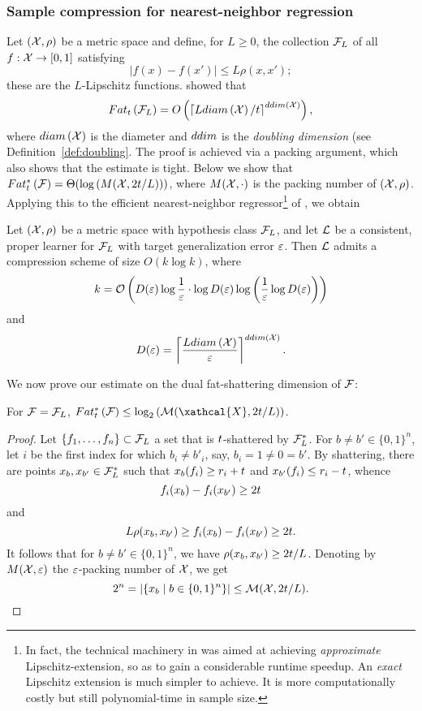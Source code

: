\documentclass[12pt,a4paper,oneside,onecolumn]{book}
\begin{document}
\subsubsection{Sample compression for nearest-neighbor regression}
\label{sec:NN}
Let $(\mathcal{X},\rho)$ be a metric space
and define, for $L\ge0$, the collection $\mathcal{F}_L$ of all $f:\mathcal{X}\to[0,1]$ satisfying
$$ |f(x)-f(x')|\le L\rho(x,x');$$
these are the $L$-Lipschitz functions.
\citet{GottliebKK17_IEEE} showed that
\begin{eqnarray*}
Fat_{t}\left(\mathcal{F}_L\right) = O\left(  \left\lceil Ldiam\left(\mathcal{X}\right)/t\right\rceil^{ddim(\mathcal{X})} \right),
\end{eqnarray*}
where $diam\left(\mathcal{X}\right)$ is the diameter and $ddim$ is the {\em doubling dimension} (see Definition~\ref{def:doubling}.
The proof is achieved via a packing argument, which also shows that the estimate is tight.
Below we show that
$  Fat^*_{t}\left(\mathcal{F}\right) =
\Theta(\log\left({M}(\mathcal{X},2t/L)\right))$,
where $M(\mathcal{X},\cdot)$ is the packing number of $(\mathcal{X},\rho)$.
Applying this to the efficient
nearest-neighbor regressor\footnote{
  In fact, the technical machinery in
  \citet{DBLP:journals/tit/GottliebKK17}
  was aimed at achieving {\em approximate} Lipschitz-extension,
  so as to gain a considerable runtime speedup. An {\em exact} Lipschitz extension
  is much simpler to achieve. It is more computationally costly but still polynomial-time in sample size.
  }
of
\citet{DBLP:journals/tit/GottliebKK17},
we obtain
\begin{corollary}
  Let $(\mathcal{X},\rho)$ be a metric space with hypothesis class $\mathcal{F}_L$,
  and let $\mathcal{L}$ be a consistent, proper learner for $\mathcal{F}_L$ with target generalization error $\varepsilon$.
Then $\mathcal{L}$ admits a compression scheme of size $O(k\log k)$, where
  \[k = \mathcal{O}\left( D(\varepsilon) \log \frac{1}{\varepsilon} \cdot \log D(\varepsilon)
      \log \left(\frac{1}{\varepsilon} \log D(\varepsilon) \right) \right)\]
and
\[D(\varepsilon) = \left\lceil\frac{Ldiam\left(\mathcal{X}\right)}{\varepsilon}\right\rceil^{ddim(\mathcal{X})}.\]
\end{corollary}


We now prove our estimate on the dual fat-shattering dimension of $\mathcal{F}$:
\begin{lemma}
  For $\mathcal{F}=\mathcal{F}_L$,
  $\dualfat{t}{\F}
  \leq \log_2\left(\mathcal{M}(\xathcal{X},2\gammat/L)\right)$.
\end{lemma}
\begin{proof}
  Let $\left\{ f_1,\ldots,f_n \right\}\subset \mathcal{F}_L$ a set that is $t$-shattered by $\mathcal{F}^*_L$.
  For $b \neq b' \in \{0,1\}^n$,
  let $i$ be the first index
  for which $b_i \neq b'_i$,
  say, $b_i = 1\neq0= b'$.
  By shattering,
  there are points $x_b,x_{b'} \in \mathcal{F}^*_L$ such that
  $x_b(f_i) \geq r_i + t$ and
  $x_{b'}(f_i) \leq r_i - t$,
  whence
  \[f_i(x_b) - f_i(x_{b'}) \geq 2t\]
  and
  \[L  \rho(x_b,x_{b'}) \geq  f_i(x_b) - f_i(x_{b'}) \geq 2t.\]
  It follows that for
  $b \neq b' \in \{0,1\}^n$,
we have
$ \rho(x_b,x_{b'}) \geq 2t / L$.
  Denoting by ${M}(\mathcal{X}, \varepsilon)$ the $\varepsilon$-packing number of $\mathcal{X}$,
 we get
  \[2^n = |\{x_b \mid b \in \{0,1\}^n\}| \leq \mathcal{M}(\mathcal{X}, 2t / L). \]
\end{proof}
\end{document}
